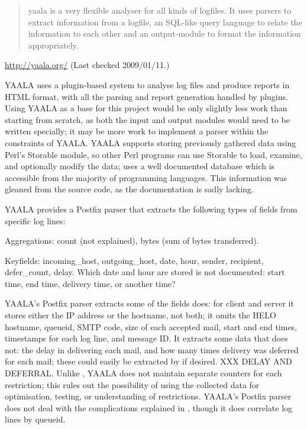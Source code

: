 \begin{quotation}

    yaala is a very flexible analyser for all kinds of logfiles. It uses
    parsers to extract information from a logfile, an SQL-like query
    language to relate the information to each other and an output-module
    to format the information appropriately.

\end{quotation}

\noindent{}\url{http://yaala.org/} \newline{}
(Last checked 2009/01/11.)

YAALA uses a plugin-based system to analyse log files and produce reports
in HTML format, with all the parsing and report generation handled by
plugins.  Using YAALA as a base for this project would be only slightly
less work than starting from scratch, as both the input and output modules
would need to be written specially; it may be more work to implement a
parser within the constraints of YAALA\@.  YAALA supports storing
previously gathered data using Perl's Storable module, so other Perl
programs can use Storable to load, examine, and optionally modify the data;
\parsername{} uses a well documented database which is accessible from the
majority of programming languages.  This information was gleaned from the
source code, as the documentation is sadly lacking.

YAALA provides a Postfix parser that extracts the following types of fields
from specific log lines:

\begin{eqlist}

    \item [Aggregations:] count (not explained), bytes (sum of bytes
        transferred).

    \item [Keyfields:] incoming\_host, outgoing\_host, date, hour, sender,
        recipient, defer\_count, delay.  Which date and hour are stored is
        not documented: start time, end time, delivery time, or another
        time?

\end{eqlist}

\noindent{}YAALA's Postfix parser extracts some of the fields \parsername{}
does: for client and server it stores either the \gls{IP} address or the
hostname, not both; it omits the HELO hostname, queueid, \gls{SMTP} code,
size of each accepted mail, start and end times, timestamps for each log
line, and message ID\@.  It extracts some data that \parsername{} does not:
the delay in delivering each mail, and how many times delivery was deferred
for each mail; these could easily be extracted by \parsername{} if desired.
XXX DELAY AND DEFERRAL\@.  Unlike \parsername{}, YAALA does not maintain
separate counters for each restriction; this rules out the possibility of
using the collected data for optimisation, testing, or understanding of
restrictions.  YAALA's Postfix parser does not deal with the complications
explained in , though it does correlate log lines
by queueid.

